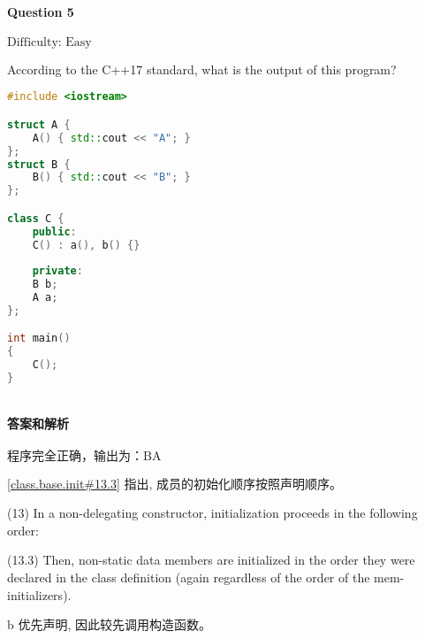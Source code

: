 \documentclass{article}
\begin{document}
	\paragraph*{Question 5}\noindent $\boxed{\text{Difficulty: Easy}} $
	
	According to the C++17 standard, what is the output of this program? 
	
	\begin{lstlisting}[language=C++]    
#include <iostream>

struct A {
	A() { std::cout << "A"; }
};
struct B {
	B() { std::cout << "B"; }
};

class C {
	public:
	C() : a(), b() {}
	
	private:
	B b;
	A a;
};

int main()
{
	C();
}
		
	\end{lstlisting}
	
	\paragraph*{答案和解析} $\boxed{\text{程序完全正确，输出为：BA}} $
	
	 \href{https://timsong-cpp.github.io/cppwp/n4659/class.base.init#13.3}{[class.base.init\#13.3]} 指出, 成员的初始化顺序按照声明顺序。
	
	\begin{lightgrayleftbar}
		(13) In a non-delegating constructor, initialization proceeds in the following order: 
		
		(13.3) Then, non-static data members are initialized in the order they were declared in the class definition (again regardless of the order of the mem-initializers). 
	\end{lightgrayleftbar}
	
	b 优先声明, 因此较先调用构造函数。
\end{document}

